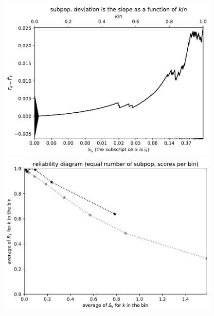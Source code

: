 \documentclass{article}
\begin{document}
\begin{figure}
\begin{centering}

\parbox{\imsize}{\includegraphics[width=\imsize]
{./codes/unweighted/nll-1-293-cheetah-chetah-Acinonyx-jubatus}}
\quad\quad
\parbox{\imsize}{\includegraphics[width=\imsize]
{./codes/unweighted/nll-1-293-cheetah-chetah-Acinonyx-jubatusequisamps10}}

\vspace{\vertsep}


\end{centering}
\end{figure}
\end{document}
